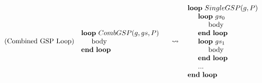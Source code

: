 \documentclass{article}
\begin{document}
%
\noindent\begin{minipage}{\linewidth}
\begin{align}
  \tag{Combined GSP Loop}
  \begin{minipage}[]{0.4\textwidth}
  \begin{algorithmic}
    \Loop\ $CombGSP(g, gs, P)$
      \State body
    \EndLoop
  \end{algorithmic}
  \end{minipage}
  &\leadsto
  \begin{minipage}[]{0.4\textwidth}
  \begin{algorithmic}
    \Loop\ $SingleGSP(g, P)$
      \Loop\ $gs_0$
        \State body
      \EndLoop
      \Loop\ $gs_1$
        \State body
      \EndLoop
      \State ...
    \EndLoop
  \end{algorithmic}
  \end{minipage}
\end{align}
\end{minipage}

\end{document}
